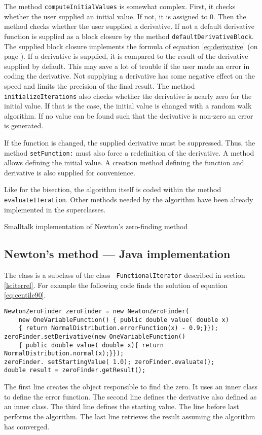 \documentclass[twoside]{book}
\begin{document}
The method {\tt computeInitialValues} is somewhat complex. First,
it checks whether the user supplied an initial value. If not, it
is assigned to 0. Then the method checks whether the user supplied
a derivative. If not a default derivative function is supplied as
a block closure by the method {\tt defaultDerivativeBlock}. The
supplied block closure implements the formula of equation
\ref{eq:derivative} (on page \pageref{eq:derivative}). If a
derivative is supplied, it is compared to the result of the
derivative supplied by default. This may save a lot of trouble if
the user made an error in coding the derivative. Not supplying a
derivative has some negative effect on the speed and limits the
precision of the final result. The method {\tt
initializeIterations} also checks whether the derivative is nearly
zero for the initial value. If that is the case, the initial value
is changed with a random walk algorithm. If no value can be found
such that the derivative is non-zero an error is generated.

If the function is changed, the supplied derivative must be
suppressed. Thus, the method {\tt setFunction:} must also force a
redefinition of the derivative. A method allows defining the
initial value. A creation method defining the function and
derivative is also supplied for convenience.

Like for the bisection, the algorithm itself is coded within the
method {\tt evaluateIteration}. Other methods needed by the
algorithm have been already implemented in the superclasses.
\begin{listing} Smalltalk implementation of Newton's zero-finding method \label{ls:newtonZero}

\end{listing}


\subsection{Newton's method --- Java implementation}
\label{sec:jnewton} The class is a subclass of the class {\tt
FunctionalIterator} described in section \ref{ls:iterrel}. For
example the following code finds the solution of equation
\ref{eq:centile90}.
\begin{verbatim}
NewtonZeroFinder zeroFinder = new NewtonZeroFinder(
    new OneVariableFunction() { public double value( double x)
    { return NormalDistribution.errorFunction(x) - 0.9;}});
zeroFinder.setDerivative(new OneVariableFunction()
    { public double value( double x){ return NormalDistribution.normal(x);}});
zeroFinder. setStartingValue( 1.0); zeroFinder.evaluate();
double result = zeroFinder.getResult();
\end{verbatim}
The first line creates the object responsible to find the zero. It
uses an inner class to define the error function. The second line
defines the derivative also defined as an inner class. The third
line defines the starting value. The line before last performs the
algorithm. The last line retrieves the result assuming the
algorithm has converged.
\end{document}
